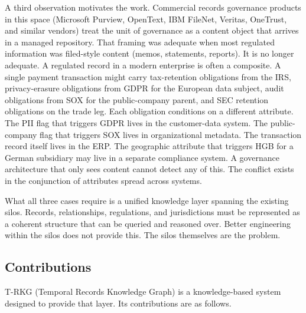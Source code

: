 \documentclass{ieeeaccess}
\begin{document}
A third observation motivates the work. Commercial records governance products in this space (Microsoft Purview, OpenText, IBM FileNet, Veritas, OneTrust, and similar vendors) treat the unit of governance as a content object that arrives in a managed repository. That framing was adequate when most regulated information was filed-style content (memos, statements, reports). It is no longer adequate. A regulated record in a modern enterprise is often a composite. A single payment transaction might carry tax-retention obligations from the IRS, privacy-erasure obligations from GDPR for the European data subject, audit obligations from SOX for the public-company parent, and SEC retention obligations on the trade leg. Each obligation conditions on a different attribute. The PII flag that triggers GDPR lives in the customer-data system. The public-company flag that triggers SOX lives in organizational metadata. The transaction record itself lives in the ERP. The geographic attribute that triggers HGB for a German subsidiary may live in a separate compliance system. A governance architecture that only sees content cannot detect any of this. The conflict exists in the conjunction of attributes spread across systems.

What all three cases require is a unified knowledge layer spanning the existing silos. Records, relationships, regulations, and jurisdictions must be represented as a coherent structure that can be queried and reasoned over. Better engineering within the silos does not provide this. The silos themselves are the problem.

\subsection{Contributions}

T-RKG (Temporal Records Knowledge Graph) is a knowledge-based system designed to provide that layer. Its contributions are as follows.
\end{document}
